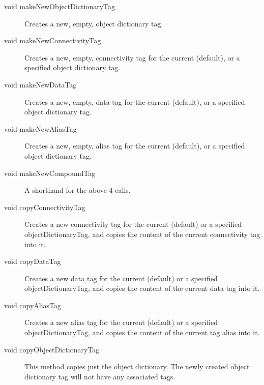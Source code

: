 \begin{description}

\item[void makeNewObjectDictionaryTag]
  Creates a new, empty, object dictionary tag.

\item[void makeNewConnectivityTag]
  Creates a new, empty, connectivity tag for the current (default), or
  a specified object dictionary tag.

\item[void makeNewDataTag]
  Creates a new, empty, data tag for the current (default), or
  a specified object dictionary tag.


\item[void makeNewAliasTag]
  Creates a new, empty, alias tag for the current (default), or
  a specified object dictionary tag.

\item[void makeNewCompoundTag]
  A shorthand for the above 4 calls.



\item[void copyConnectivityTag]
Creates a new connectivity tag for the current (default) or a
specified objectDictionaryTag, and copies the content of the current
connectivity tag into it.  

\item[void copyDataTag]
Creates a new data tag for the current (default) or a
specified objectDictionaryTag, and copies the content of the current
data tag into it.  

\item[void copyAliasTag]
Creates a new alias tag for the current (default) or a
specified objectDictionaryTag, and copies the content of the current
tag alias into it.  

\item[void copyObjectDictionaryTag]
This method copies just the object dictionary. The newly created
object dictionary tag will not have any associated tags.



\end{description}
